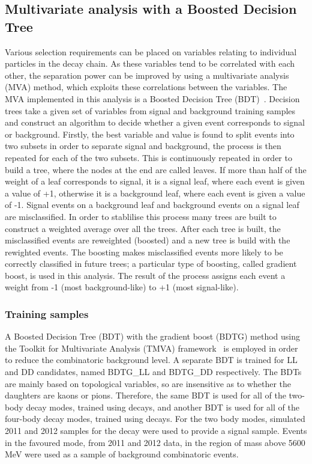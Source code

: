 \subsection{Multivariate analysis with a Boosted Decision Tree}
\label{sec:selection:bdt}

Various selection requirements can be placed on variables relating to individual particles in the decay chain. As these variables tend to be correlated with each other, the separation power can be improved by using a multivariate analysis (MVA) method, which exploits these correlations between the variables. The MVA implemented in this analysis is a Boosted Decision Tree (BDT)~\cite{Breiman}. Decision trees take a given set of variables from signal and background training samples and construct an algorithm to decide whether a given event corresponds to signal or background. Firstly, the best variable and value is found to split events into two subsets in order to separate signal and background, the process is then repeated for each of the two subsets. This is continuously repeated in order to build a tree, where the nodes at the end are called leaves. If more than half of the weight of a leaf corresponds to signal, it is a signal leaf, where each event is given a value of +1, otherwise it is a background leaf, where each event is given a value of -1. Signal events on a background leaf and background events on a signal leaf are misclassified. In order to stablilise this process many trees are built to construct a weighted average over all the trees. After each tree is built, the misclassified events are reweighted (boosted) and a new tree is build with the rewighted events. The boosting makes misclassified events more likely to be correctly classified in future trees; a particular type of boosting, called gradient boost, is used in this analysis. The result of the process assigns each event a weight from -1 (most background-like) to +1 (most signal-like). 

\subsubsection{Training samples}

A Boosted Decision Tree (BDT) with the gradient boost (BDTG) method using the Toolkit for Multivariate Analysis (TMVA) framework~\cite{TMVA} is employed in order to reduce the combinatoric background level. A separate BDT is trained for LL and DD candidates, named BDTG\_LL and BDTG\_DD respectively. The BDTs are mainly based on topological variables, so are insensitive as to whether the \Dz daughters are kaons or pions. Therefore, the same BDT is used for all of the two-body \Dz decay modes, trained using \kpi decays, and another BDT is used for all of the four-body \Dz decay modes, trained using \kpipipi decays. For the two body modes, simulated 2011 and 2012 samples for the decay \kpi were used to provide a signal sample. Events in the favoured \kpi mode, from 2011 and 2012 data, in the region of \Bm mass above 5600 MeV were used as a sample of background combinatoric events. 

